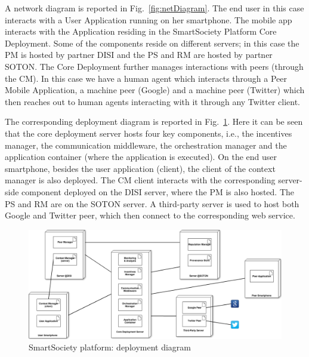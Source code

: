 A network diagram is reported in Fig.~\ref{fig:netDiagram}. The end user in this case interacts with a User Application running on her smartphone. The mobile app interacts with the Application residing in the SmartSociety Platform Core Deployment. Some of the components reside on different servers; in this case the PM is hosted by partner DISI and the PS and RM are hosted by partner SOTON. The Core Deployment further manages interactions with peers (through the CM). In this case we have a human agent which interacts through a Peer Mobile Application, a machine peer (Google) and a machine peer (Twitter) which then reaches out to human agents interacting with it through any Twitter client.



The corresponding deployment diagram is reported in Fig.~\ref{fig:deployDiagram}. Here it can be seen that the core deployment server hosts four key components, i.e., the incentives manager, the communication middleware, the orchestration manager and the application container (where the application is executed). On the end user smartphone, besides the user application (client), the client of the context manager is also  deployed. The CM client interacts with the corresponding server-side component deployed on the DISI server, where the PM is also hosted. The PS and RM are on the SOTON server. A third-party server is used to host both Google and Twitter peer, which then connect to the corresponding web service.
\begin{figure}
 \centering
 \includegraphics[width=1\textwidth]{figs/deploymentView}
 \caption{SmartSociety platform: deployment diagram}
 \label{fig:deployDiagram}
\end{figure}

